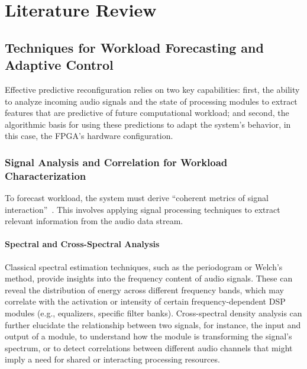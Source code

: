 \chapter{Literature Review}

\section{Techniques for Workload Forecasting and Adaptive Control}

Effective predictive reconfiguration relies on two key capabilities: first, the ability to analyze incoming audio signals and the state of processing modules to extract features that are predictive of future computational workload; and second, the algorithmic basis for using these predictions to adapt the system's behavior, in this case, the FPGA's hardware configuration.

\subsection{Signal Analysis and Correlation for Workload Characterization}

To forecast workload, the system must derive ``coherent metrics of signal interaction''~\cite{ref1}. This involves applying signal processing techniques to extract relevant information from the audio data stream.

\subsubsection{Spectral and Cross-Spectral Analysis}
Classical spectral estimation techniques, such as the periodogram or Welch's method, provide insights into the frequency content of audio signals. These can reveal the distribution of energy across different frequency bands, which may correlate with the activation or intensity of certain frequency-dependent DSP modules (e.g., equalizers, specific filter banks). Cross-spectral density analysis can further elucidate the relationship between two signals, for instance, the input and output of a module, to understand how the module is transforming the signal's spectrum, or to detect correlations between different audio channels that might imply a need for shared or interacting processing resources.

